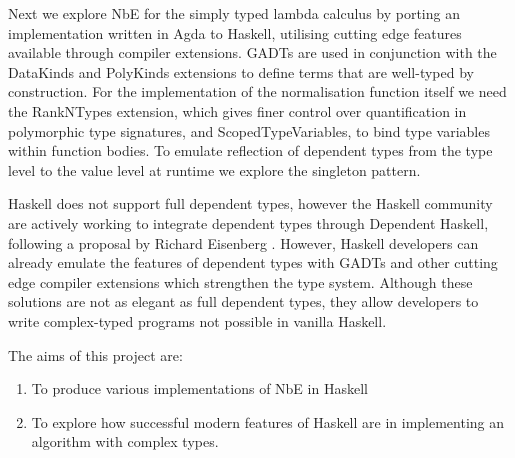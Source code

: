 Next we explore NbE for the simply typed lambda calculus by porting an implementation written in Agda to Haskell, utilising cutting edge features available through compiler extensions. GADTs are used in conjunction with the DataKinds and PolyKinds extensions to define terms that are well-typed by construction. For the implementation of the normalisation function itself we need the RankNTypes extension, which gives finer control over quantification in polymorphic type signatures, and ScopedTypeVariables, to bind type variables within function bodies. To emulate reflection of dependent types from the type level to the value level at runtime we explore the singleton pattern.


Haskell does not support full dependent types, however the Haskell community are actively working to integrate dependent types through Dependent Haskell\cite{DH}, following a proposal by Richard Eisenberg \cite{GADTs}. 
However, Haskell developers can already emulate the features of dependent types with GADTs and other cutting edge compiler extensions which strengthen the type system. Although these solutions are not as elegant as full dependent types, they allow developers to write complex-typed programs not possible in vanilla Haskell.

The aims of this project are:
\begin{enumerate}
    \item To produce various implementations of NbE in Haskell
    \item To explore how successful modern features of Haskell are in implementing an algorithm with complex types.
\end{enumerate}